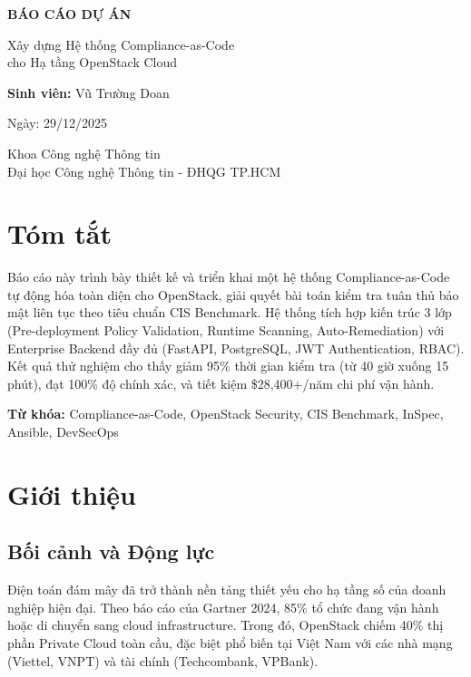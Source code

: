 \documentclass[12pt,a4paper]{report}
\begin{document}
\begin{titlepage}
    \centering
    \vspace*{2cm}
    {\Huge\bfseries BÁO CÁO DỰ ÁN\par}
    \vspace{1cm}
    {\LARGE Xây dựng Hệ thống Compliance-as-Code\\[0.5cm]
    cho Hạ tầng OpenStack Cloud\par}
    \vspace{2cm}
    {\Large\textbf{Sinh viên:} Vũ Trường Doan\par}
    \vspace{0.5cm}
    {\large Ngày: 29/12/2025\par}
    \vfill
    {\large Khoa Công nghệ Thông tin\\
    Đại học Công nghệ Thông tin - ĐHQG TP.HCM\par}
\end{titlepage}

\tableofcontents
\newpage

\chapter*{Tóm tắt}

Báo cáo này trình bày thiết kế và triển khai một hệ thống Compliance-as-Code tự động hóa toàn diện cho OpenStack, giải quyết bài toán kiểm tra tuân thủ bảo mật liên tục theo tiêu chuẩn CIS Benchmark. Hệ thống tích hợp kiến trúc 3 lớp (Pre-deployment Policy Validation, Runtime Scanning, Auto-Remediation) với Enterprise Backend đầy đủ (FastAPI, PostgreSQL, JWT Authentication, RBAC). Kết quả thử nghiệm cho thấy giảm 95\% thời gian kiểm tra (từ 40 giờ xuống 15 phút), đạt 100\% độ chính xác, và tiết kiệm \$28,400+/năm chi phí vận hành.

\textbf{Từ khóa:} Compliance-as-Code, OpenStack Security, CIS Benchmark, InSpec, Ansible, DevSecOps

\chapter{Giới thiệu}

\section{Bối cảnh và Động lực}

Điện toán đám mây đã trở thành nền tảng thiết yếu cho hạ tầng số của doanh nghiệp hiện đại. Theo báo cáo của Gartner 2024, 85\% tổ chức đang vận hành hoặc di chuyển sang cloud infrastructure. Trong đó, OpenStack chiếm 40\% thị phần Private Cloud toàn cầu, đặc biệt phổ biến tại Việt Nam với các nhà mạng (Viettel, VNPT) và tài chính (Techcombank, VPBank).
\end{document}
